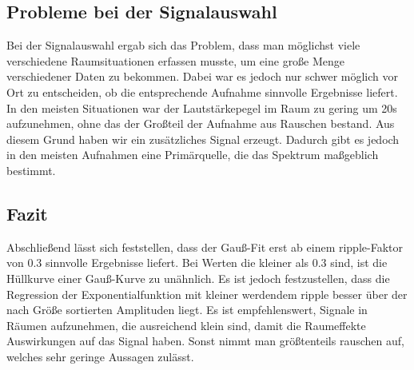 \subsection{Probleme bei der Signalauswahl}
Bei der Signalauswahl ergab sich das Problem, dass man möglichst viele verschiedene Raumsituationen erfassen musste, um eine große Menge verschiedener Daten zu bekommen. Dabei war es jedoch nur schwer möglich vor Ort zu entscheiden, ob die entsprechende Aufnahme sinnvolle Ergebnisse liefert.
In den meisten Situationen war der Lautstärkepegel im Raum zu gering um 20s aufzunehmen, ohne das der Großteil der Aufnahme aus Rauschen bestand. Aus diesem Grund haben wir ein zusätzliches Signal erzeugt. Dadurch gibt es jedoch in den meisten Aufnahmen eine Primärquelle, die das Spektrum maßgeblich bestimmt.

\subsection{Fazit}
Abschließend lässt sich feststellen, dass der Gauß-Fit erst ab einem ripple-Faktor von 0.3 sinnvolle Ergebnisse liefert. Bei Werten die kleiner als 0.3 sind, ist die Hüllkurve einer Gauß-Kurve zu unähnlich. Es ist jedoch festzustellen, dass die Regression der Exponentialfunktion mit kleiner werdendem ripple besser über der nach Größe sortierten Amplituden liegt.
Es ist empfehlenswert, Signale in Räumen aufzunehmen, die ausreichend klein sind, damit die Raumeffekte Auswirkungen auf das Signal haben. Sonst nimmt man größtenteils rauschen auf, welches sehr geringe Aussagen zulässt.
